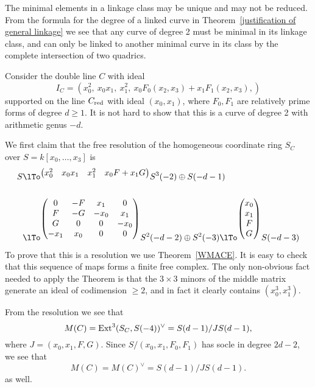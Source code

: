 \begin{example} \label{double lines of higher genus}
The minimal elements in a linkage class may be unique and may not be reduced. From the formula
for the degree of a linked curve in Theorem~\ref{justification of general linkage} we see that
any curve of degree 2 must be minimal in its linkage class, and can only be linked to another 
minimal curve in its class by the complete intersection of two quadrics.

Consider the double line $C$ with ideal 
$$
I_{C}= (x_{0}^{2},\ x_0x_1,\ x_{1}^{2},\ x_{0}F_{0}(x_{2},x_{3})+x_{1}F_{1}(x_{2},x_{3}), )
$$
supported on the line $C_{{\rm red}}$ with ideal $(x_{0}, x_{1})$, where $F_{0}, F_{1}$ are relatively prime forms
of degree $d\geq 1$. It is not hard to show that this is a curve of degree 2 with arithmetic genus $-d$.

We first claim that the free resolution of the homogeneous coordinate ring $S_C$ over $S = k[x_0,\dots,x_3]$ is
\begin{align*}
 S&\lTo^{
\begin{pmatrix}
x_0^2&x_0x_1&x_1^2&x_0F+x_1G
\end{pmatrix}
}
S^3(-2)\oplus S(-d-1)
\\ \\
&
\lTo^{
\begin{pmatrix}
0&-F&x_1&0\\
F&-G&-x_0&x_1\\
G&0&0&-x_0\\
-x_1&x_0&0&0
\end{pmatrix}
}
S^2(-d-2)\oplus S^2(-3)
\lTo^{
\begin{pmatrix}
 x_0\\
 x_1\\
 F\\
 G
 \end{pmatrix}
}
S(-d-3)
\end{align*}
To prove that this is a resolution we use Theorem~\ref{WMACE}. It is easy to check that this sequence of maps forms a finite free complex.
 The only non-obvious fact needed to apply the Theorem 
is that the $3\times 3$ minors of the middle
matrix generate an ideal of codimension $\geq 2$, and in fact it clearly contains $(x_0^3, x_1^3)$.

From the resolution we
see that 
$$
M(C) = {\rm{Ext}}^3(S_C, S(-4))^\vee = S(d-1)/JS(d-1),
$$
where $J = (x_0,x_1,F,G)$. Since $S/(x_{0}, x_{1}, F_{0}, F_{1})$ has socle in degree $2d-2$, we see that 
$$
M(C) = M(C)^\vee = S(d-1)/JS(d-1).
$$
as well.
\end{example}


